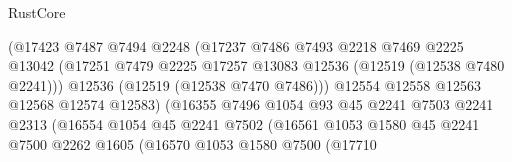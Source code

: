 \begin{lexlean}{RustCore}
\begin{coremodule}
                                      (@17423
                                        @7487
                                        @7494
                                        @2248
                                        (@17237
                                          @7486
                                          @7493
                                          @2218
                                          @7469
                                          @2225
                                          @13042
                                          (@17251
                                            @7479
                                            @2225
                                            @17257
                                            @13083
                                            @12536
                                            (@12519 (@12538 @7480 @2241)))
                                          @12536
                                          (@12519 (@12538 @7470 @7486)))
                                        @12554
                                        @12558
                                        @12563
                                        @12568
                                        @12574
                                        @12583)
                                      (@16355
                                        @7496
                                        @1054
                                        @93
                                        @45
                                        @2241
                                        @7503
                                        @2241
                                        @2313
                                        (@16554
                                          @1054
                                          @45
                                          @2241
                                          @7502
                                          (@16561
                                            @1053
                                            @1580
                                            @45
                                            @2241
                                            @7500
                                            @2262
                                            @1605
                                            (@16570
                                              @1053
                                              @1580
                                              @7500
                                              (@17710

\end{coremodule}
\end{lexlean}

